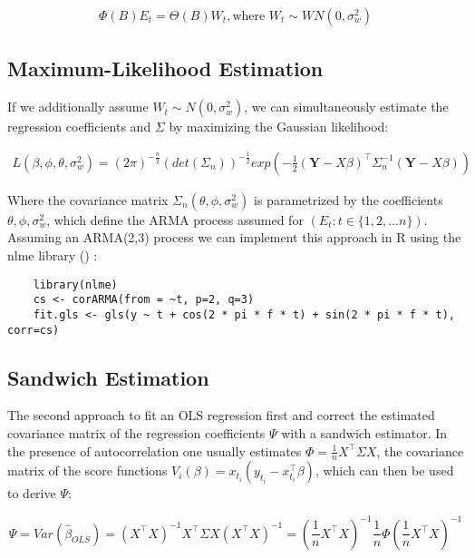 \begin{gather*}
    \Phi(B)E_t = \Theta(B)W_t, \text{where $W_t \sim WN(0, \sigma_w^2)$}
\end{gather*}


\subsection{Maximum-Likelihood Estimation}\label{subsec:maximum-likelihood-estimation}

If we additionally assume $W_t \sim N(0, \sigma_w^2)$, we can simultaneously estimate the regression coefficients and $\Sigma$ by
maximizing the Gaussian likelihood:

\begin{gather*}
    L(\beta, \phi, \theta, \sigma_w^2) = (2 \pi)^{-\frac{n}{2}} (det(\Sigma_n))^{-\frac{1}{2}} exp(-\frac{1}{2}
    (\mathbf{Y}-X\beta)^{\top} \Sigma_n^{-1}(\mathbf{Y}-X\beta))
\end{gather*}

Where the covariance matrix $\Sigma_n(\theta, \phi, \sigma_w^2)$ is parametrized by the coefficients $\theta, \phi, \sigma_w^2$, which
define the ARMA process assumed for $(E_t: t \in \{1, 2, \dots  n \})$.
Assuming an ARMA(2,3) process we can implement this approach in R using the nlme library (\citeauthor{box_time_1994})
:
\begin{verbatim}
    library(nlme)
    cs <- corARMA(from = ~t, p=2, q=3)
    fit.gls <- gls(y ~ t + cos(2 * pi * f * t) + sin(2 * pi * f * t), corr=cs)
\end{verbatim}


\subsection{Sandwich Estimation}
The second approach to fit an OLS regression first and correct the estimated covariance matrix of the regression coefficients $\Psi$ with a
sandwich estimator.
In the presence of autocorrelation one usually estimates $\Phi = \frac{1}{n} X^{\top} \Sigma X$,
the covariance matrix of the score functions
$V_i(\beta) = x_{t_i}(y_{t_i} - x_{t_i}^{\top}\beta)$, which can then be used to derive $\Psi$:

\begin{equation}\label{eq:sandwich}
\Psi = Var(\hat \beta_{OLS}) = (X^{\top} X)^{-1} X^{\top} \Sigma X (X^{\top}X)^{-1} =
(\frac{1}{n} X^{\top} X)^{-1} \frac{1}{n} \Phi (\frac{1}{n} X^{\top} X)^{-1}
\end{equation}


